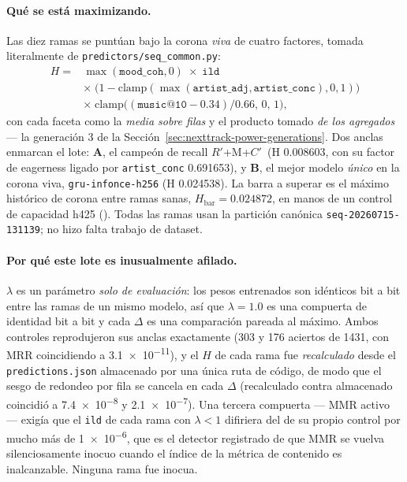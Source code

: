 \documentclass[11pt]{article}
\newcommand{\runid}[1]{\texttt{\small\seqsplit{#1}}}
\newcommand{\dsid}[1]{\texttt{\small #1}}
\newcommand{\Rp}{\ensuremath{R'}}
\newcommand{\Cp}{\ensuremath{C'}}
\begin{document}
\paragraph{Qué se está maximizando.} Las diez ramas se puntúan bajo la corona
\emph{viva} de cuatro factores, tomada literalmente de
\texttt{predictors/seq\_common.py}:
\[
  \begin{aligned}
    H = {}& \max(\texttt{mood\_coh},0)\;\times\;\texttt{ild}\\
          &\times\;\bigl(1-\mathrm{clamp}(\max(\texttt{artist\_adj},
             \texttt{artist\_conc}),0,1)\bigr)\\
          &\times\;\mathrm{clamp}\bigl((\texttt{music@10}-\num{0.34})/\num{0.66},
             \,0,\,1\bigr),
  \end{aligned}
\]
con cada faceta como la \emph{media sobre filas} y el producto tomado \emph{de los
agregados} --- la generación 3 de la Sección~\ref{sec:nexttrack-power-generations}. Dos
anclas enmarcan el lote: \textbf{A}, el campeón de recall \Rp+M+\Cp\ (H
\num{0.008603}, con su factor de eagerness ligado por \texttt{artist\_conc}
\num{0.691653}), y \textbf{B}, el mejor modelo \emph{único} en la corona viva,
\texttt{gru-infonce-h256} (H \num{0.024538}). La barra a superar es el máximo
histórico de corona entre ramas sanas, $H_{\mathrm{bar}} = \num{0.024872}$, en
manos de un control de capacidad h425
(\runid{run-20260725-143502-be11b-seq-nexttrack}). Todas las ramas usan la
partición canónica \dsid{seq-20260715-131139}; no hizo falta trabajo de dataset.

\paragraph{Por qué este lote es inusualmente afilado.} $\lambda$ es un parámetro
\emph{solo de evaluación}: los pesos entrenados son idénticos bit a bit entre las
ramas de un mismo modelo, así que $\lambda=\num{1.0}$ es una compuerta de
identidad bit a bit y cada $\Delta$ es una comparación pareada al máximo. Ambos
controles reprodujeron sus anclas exactamente (\num{303} y \num{176} aciertos de
\num{1431}, con MRR coincidiendo a \num{3.1e-11}), y el $H$ de cada rama fue
\emph{recalculado} desde el \texttt{predictions.json} almacenado por una única ruta
de código, de modo que el sesgo de redondeo por fila se cancela en cada $\Delta$
(recalculado contra almacenado coincidió a \num{7.4e-8} y \num{2.1e-7}). Una
tercera compuerta --- MMR activo --- exigía que el \texttt{ild} de cada rama con
$\lambda<1$ difiriera del de su propio control por mucho más de \num{1e-6}, que es
el detector registrado de que MMR se vuelva silenciosamente inocuo cuando el
índice de la métrica de contenido es inalcanzable. Ninguna rama fue inocua.
\end{document}
